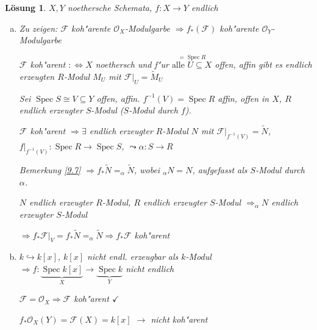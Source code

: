 \documentclass[paper = A4, fontsize=12pt, numbers=noendperiod, chapterprefix=true]{scrbook}
\theoremstyle{break}
\newtheorem{Loes}{L\"osung}
\theoremstyle{nonumberbreak}
\theoremstyle{nonumberplain}
\DeclareMathOperator{\Spec}{Spec}
\newcommand{\calF}{\mathcal{F}}
\newcommand{\calO}{\mathcal{O}}
\begin{document}
\begin{Loes}
$X, Y$ noethersche Schemata, $f:X \to Y$ endlich
\begin{enumerate}[a)]
\item
	\emph{Zu zeigen:} $\calF$ koh"arente $\calO_X$-Modulgarbe $\Rightarrow f_*(\calF)$ koh"arente $\calO_Y$-Modulgarbe
	
	$\calF$ koh"arent $:\Leftrightarrow X$ noethersch und f"ur $\overset{=\Spec R}{\text{alle }U \subseteq X}$ offen, affin gibt es endlich erzeugten $R$-Modul $M_U$ mit $\calF|_U = \tilde M_U$
	
	Sei $\Spec S \cong V \subseteq Y$ offen, affin. $f^{-1}(V) = \Spec R$ affin, offen in $X$, $R$ endlich erzeugter $S$-Modul ($S$-Modul durch $f$).
	
	$\calF$ koh"arent $\Rightarrow \exists$ endlich erzeugter $R$-Modul $N$ mit $\calF|_{f^{-1}(V)} = \tilde N$, $f|_{f^{-1}(V)}: \Spec R \to \Spec S$, $\leadsto \alpha: S \to R$
	
	Bemerkung \ref{9.7} $\Rightarrow f_*\tilde N = _\alpha\tilde N$, wobei $_\alpha N = N$, aufgefasst als $S$-Modul durch $\alpha$.
	
	$N$ endlich erzeugter $R$-Modul, $R$ endlich erzeugter $S$-Modul $\Rightarrow _\alpha N$ endlich erzeugter $S$-Modul
	
	$\Rightarrow f_*\calF|_V = f_*\tilde N = _\alpha \tilde N \Rightarrow f_* \calF$ koh"arent
\item
	$k \hookrightarrow k[x]$, $k[x]$ nicht endl. erzeugbar als $k$-Modul $\Rightarrow f: \underbrace{\Spec k[x]}_{X} \to \underbrace{\Spec k}_{Y}$ nicht endlich
	
	$\calF = \calO_X \Rightarrow \calF$ koh"arent $\checkmark$
	
	$f_*\calO_X(Y) = \calF(X) = k[x]$ $\rightarrow$ nicht koh"arent
\end{enumerate}\end{Loes}
\end{document}
